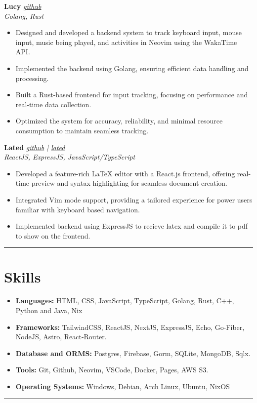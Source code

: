 \documentclass[a4paper,10pt]{article}
\begin{document}
\textbf{Lucy} \hfill \textit{\href{http://github.com/quantinium03/lucy}{github}} \\
\textit{Golang, Rust} \\
\vspace{-15pt}
\begin{itemize}[itemsep=0pt, parsep=0pt]
    \item Designed and developed a backend system to track keyboard input, mouse input, music being played, and activities in Neovim using the WakaTime API.  
    \item Implemented the backend using Golang, ensuring efficient data handling and processing.  
    \item Built a Rust-based frontend for input tracking, focusing on performance and real-time data collection.  
    \item Optimized the system for accuracy, reliability, and minimal resource consumption to maintain seamless tracking.  
\end{itemize}

\textbf{Lated} \hfill \textit{\href{http://github.com/quantinium03/lated}{github} | \href{http://lated.vercel.app}{lated}} \\
\textit{ReactJS, ExpressJS, JavaScript/TypeScript} \\
\vspace{-15pt}
\begin{itemize}[itemsep=0pt, parsep=0pt]
    \item Developed a feature-rich LaTeX editor with a React.js frontend, offering real-time preview and syntax highlighting for seamless document creation.
    \item Integrated Vim mode support, providing a tailored experience for power users familiar with keyboard based navigation.
    \item Implemented backend using ExpressJS to recieve latex and compile it to pdf to show on the frontend.
\end{itemize}

\vspace{5pt}
\hrule
\vspace{5pt}

\section*{Skills}
\begin{itemize}[itemsep=0pt, parsep=0pt]
    \item \textbf{Languages:} HTML, CSS, JavaScript, TypeScript, Golang, Rust, C++, Python and Java, Nix
    \item \textbf{Frameworks:} TailwindCSS, ReactJS, NextJS, ExpressJS, Echo, Go-Fiber, NodeJS, Astro, React-Router.
    \item \textbf{Database and ORMS:} Postgres, Firebase, Gorm, SQLite, MongoDB, Sqlx.
    \item \textbf{Tools:} Git, Github, Neovim, VSCode, Docker, Pages, AWS S3.
    \item \textbf{Operating Systems:} Windows, Debian, Arch Linux, Ubuntu, NixOS
\end{itemize}
\vspace{5pt}

\hrule
\vspace{5pt}

\end{document}
